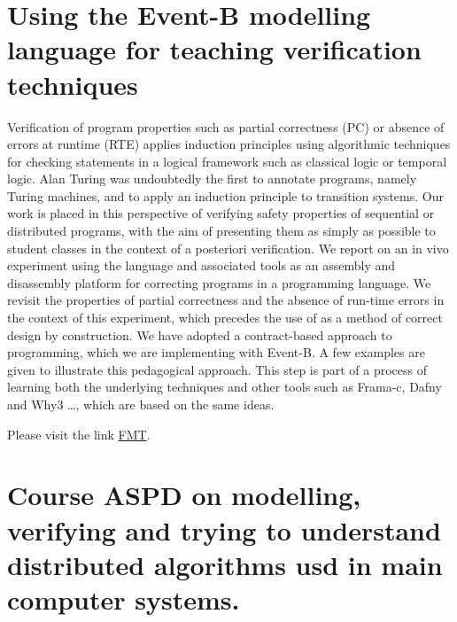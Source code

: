 \documentclass[ 12pt]{article}
\begin{document}
\section{Using  the Event-B modelling language  for teaching verification 
techniques }

Verification of program properties such as partial correctness (PC) or absence of errors at runtime (RTE) applies induction principles using algorithmic techniques for checking statements in a logical framework such as classical logic or temporal logic.  Alan Turing was undoubtedly the first to annotate programs, namely Turing machines, and to apply an induction principle to transition systems.  Our work is placed in this perspective of verifying safety properties of sequential or distributed programs, with the aim of presenting them as simply as possible to student classes in the context of a posteriori verification.  We report on an in vivo experiment using the \eb language and associated tools as an assembly and disassembly platform for correcting programs in a programming language.  We revisit the properties of partial correctness and the absence of run-time errors in the context of this experiment, which precedes the use of \eb as a method of correct design by construction.  We have adopted a contract-based approach to programming, which we are implementing with Event-B.  A few examples are given to illustrate this pedagogical approach.  This step is part of a process of learning both the underlying techniques and other tools such as Frama-c, Dafny and Why3 \ldots, which are based on the same ideas.

Please visit the link \href{https://mery54.github.io/fmt}{FMT}.

\section{Course ASPD on modelling, verifying and trying to understand distributed algorithms usd in  main  computer systems. }
\end{document}
